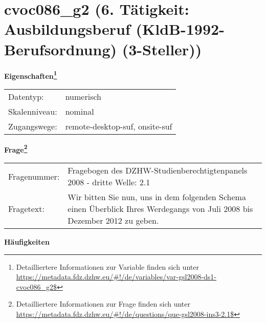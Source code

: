 
    \setcounter{footnote}{0}

    \vspace*{-1.8cm}
	\section{cvoc086\_g2 (6. Tätigkeit: Ausbildungsberuf (KldB-1992-Berufsordnung) (3-Steller))}
	\label{section:cvoc086_g2}



    \vspace*{0.5cm}
    \noindent\textbf{Eigenschaften\footnote{Detailliertere Informationen zur Variable finden sich unter
		\url{https://metadata.fdz.dzhw.eu/\#!/de/variables/var-gsl2008-ds1-cvoc086_g2$}}}\\
	\begin{tabularx}{\hsize}{@{}lX}
	Datentyp: & numerisch \\
	Skalenniveau: & nominal \\
	Zugangswege: &
	  remote-desktop-suf, 
	  onsite-suf
 \\
    \end{tabularx}



				\vspace*{0.5cm}
                \noindent\textbf{Frage\footnote{Detailliertere Informationen zur Frage finden sich unter
		              \url{https://metadata.fdz.dzhw.eu/\#!/de/questions/que-gsl2008-ins3-2.1$}}}\\
				\begin{tabularx}{\hsize}{@{}lX}
					Fragenummer: &
					  Fragebogen des DZHW-Studienberechtigtenpanels 2008 - dritte Welle:
					  2.1
 \\
					Fragetext: & Wir bitten Sie nun, uns in dem folgenden Schema einen Überblick Ihres Werdegangs von Juli 2008 bis Dezember 2012 zu geben. \\
				\end{tabularx}





        		\vspace*{0.5cm}
                \noindent\textbf{Häufigkeiten}

